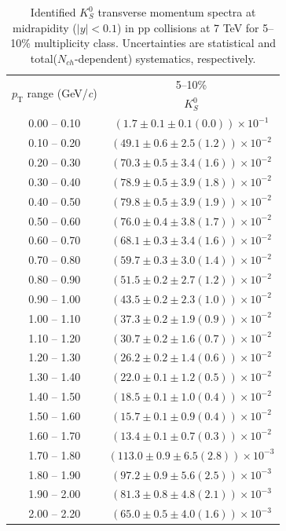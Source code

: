 \begin{table}
\caption{Identified $K^{0}_{S}$ transverse momentum spectra at midrapidity ($|y|<0.1$) in pp collisions at 7 TeV for 5--10\% multiplicity class. Uncertainties are statistical and total($N_{ch}$-dependent) systematics, respectively.}
\label{tab:K0Short_5to10}
\begin{center}
\begin{tabular}{ c | c }
\hline
\multirow{2}{*}{$p_{\mathrm{T}}$ range (GeV/\textit{c})} & \multicolumn{1}{c}{5--10\%} \\ & $K^{0}_{S}$\\ 
\hline
0.00 -- 0.10 & $(1.7\pm0.1\pm0.1(0.0))\times10^{-1}$ \\ 
0.10 -- 0.20 & $(49.1\pm0.6\pm2.5(1.2))\times10^{-2}$ \\ 
0.20 -- 0.30 & $(70.3\pm0.5\pm3.4(1.6))\times10^{-2}$ \\ 
0.30 -- 0.40 & $(78.9\pm0.5\pm3.9(1.8))\times10^{-2}$ \\ 
0.40 -- 0.50 & $(79.8\pm0.5\pm3.9(1.9))\times10^{-2}$ \\ 
0.50 -- 0.60 & $(76.0\pm0.4\pm3.8(1.7))\times10^{-2}$ \\ 
0.60 -- 0.70 & $(68.1\pm0.3\pm3.4(1.6))\times10^{-2}$ \\ 
0.70 -- 0.80 & $(59.7\pm0.3\pm3.0(1.4))\times10^{-2}$ \\ 
0.80 -- 0.90 & $(51.5\pm0.2\pm2.7(1.2))\times10^{-2}$ \\ 
0.90 -- 1.00 & $(43.5\pm0.2\pm2.3(1.0))\times10^{-2}$ \\ 
1.00 -- 1.10 & $(37.3\pm0.2\pm1.9(0.9))\times10^{-2}$ \\ 
1.10 -- 1.20 & $(30.7\pm0.2\pm1.6(0.7))\times10^{-2}$ \\ 
1.20 -- 1.30 & $(26.2\pm0.2\pm1.4(0.6))\times10^{-2}$ \\ 
1.30 -- 1.40 & $(22.0\pm0.1\pm1.2(0.5))\times10^{-2}$ \\ 
1.40 -- 1.50 & $(18.5\pm0.1\pm1.0(0.4))\times10^{-2}$ \\ 
1.50 -- 1.60 & $(15.7\pm0.1\pm0.9(0.4))\times10^{-2}$ \\ 
1.60 -- 1.70 & $(13.4\pm0.1\pm0.7(0.3))\times10^{-2}$ \\ 
1.70 -- 1.80 & $(113.0\pm0.9\pm6.5(2.8))\times10^{-3}$ \\ 
1.80 -- 1.90 & $(97.2\pm0.9\pm5.6(2.5))\times10^{-3}$ \\ 
1.90 -- 2.00 & $(81.3\pm0.8\pm4.8(2.1))\times10^{-3}$ \\ 
2.00 -- 2.20 & $(65.0\pm0.5\pm4.0(1.6))\times10^{-3}$ \\ 

\end{tabular}
\end{center}
\end{table}

